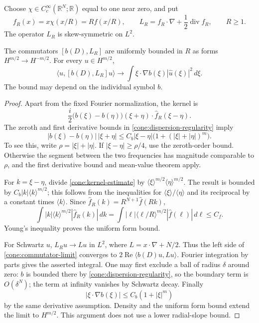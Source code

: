 Choose \(\chi\in C_c^\infty(\mathbb R^N;\mathbb R)\) equal to one
near zero, and put
\[
f_R(x)=x\chi(x/R)=R f(x/R),\qquad
L_R=f_R\cdot\nabla+\frac12\operatorname{div}f_R,\qquad R\ge1.
\]
The operator \(L_R\) is skew-symmetric on \(L^2\).

\begin{lemma}\label{cone:commutator}
The commutators \([b(D),L_R]\) are uniformly bounded in \(R\)
as forms \(H^{m/2}\to H^{-m/2}\). For every \(u\in H^{m/2}\),
\begin{equation}\label{cone:commutator-limit}
\langle u,[b(D),L_R]u\rangle
\longrightarrow
\int \xi\cdot\nabla b(\xi)|\widehat u(\xi)|^2\,d\xi.
\end{equation}
The bound may depend on the individual symbol \(b\).
\end{lemma}
\begin{proof}
Apart from the fixed Fourier normalization, the kernel is
\[
\frac i2\bigl(b(\xi)-b(\eta)\bigr)
(\xi+\eta)\cdot\widehat f_R(\xi-\eta).
\]
The zeroth and first derivative bounds in
\eqref{cone:dispersion-regularity} imply
\begin{equation}\label{cone:kernel-estimate}
|b(\xi)-b(\eta)|\,|\xi+\eta|
\le C_b|\xi-\eta|\bigl(1+(|\xi|+|\eta|)^m\bigr).
\end{equation}
To see this, write \(\rho=|\xi|+|\eta|\). If
\(|\xi-\eta|\ge\rho/4\), use the zeroth-order bound.
Otherwise the segment between the two frequencies has magnitude
comparable to \(\rho\), and the first derivative bound and
mean-value theorem apply.

For \(k=\xi-\eta\), divide \eqref{cone:kernel-estimate} by
\(\langle\xi\rangle^{m/2}\langle\eta\rangle^{m/2}\).
The result is bounded by \(C_b|k|\langle k\rangle^{m/2}\);
this follows from the inequalities for
\(\langle\xi\rangle/\langle\eta\rangle\) and its reciprocal
by a constant times \(\langle k\rangle\).
Since \(\widehat f_R(k)=R^{N+1}\widehat f(Rk)\),
\[
\int |k|\langle k\rangle^{m/2}|\widehat f_R(k)|\,dk
=\int |\ell|\langle\ell/R\rangle^{m/2}
|\widehat f(\ell)|\,d\ell\le C_f.
\]
Young's inequality proves the uniform form bound.

For Schwartz \(u\), \(L_Ru\to Lu\) in \(L^2\), where
\(L=x\cdot\nabla+N/2\). Thus the left side of
\eqref{cone:commutator-limit} converges to
\(2\operatorname{Re}\langle b(D)u,Lu\rangle\).
Fourier integration by parts gives the asserted integral. One may
first exclude a ball of radius \(\delta\) around zero: \(b\)
is bounded there by \eqref{cone:dispersion-regularity}, so the
boundary term is \(O(\delta^N)\); the term at infinity vanishes
by Schwartz decay. Finally
\[
|\xi\cdot\nabla b(\xi)|\le C_b(1+|\xi|^m)
\]
by the same derivative assumption. Density and the uniform form
bound extend the limit to \(H^{m/2}\). This argument does not use
a lower radial-slope bound.
\end{proof}

